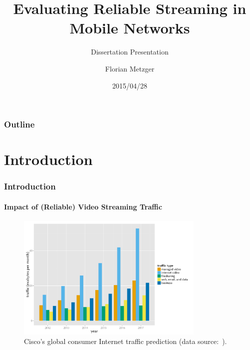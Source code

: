 \documentclass{beamer}
\title[]{Evaluating Reliable Streaming in Mobile Networks}
\subtitle{Dissertation Presentation}
\author{Florian Metzger}
\institute[]
{
	University of Vienna // University of Duisburg-Essen

}
\date[]{2015/04/28}
\begin{document}
\frame{\titlepage}

\begin{frame}
	\frametitle{Outline}
	\tableofcontents
\end{frame}

\section{Introduction}



\begin{frame}
	\frametitle{Introduction}
	\framesubtitle{Impact of (Reliable) Video Streaming Traffic}

	\begin{figure}
		\centering
		\includegraphics[height=6cm]{../../chapters/01-intro/images/r-cisco-vni-2013.pdf}
		\caption{Cisco's global consumer Internet traffic prediction (data source:~\cite{cisco2013VNI}).}
	\end{figure}
\end{frame}
\end{document}
